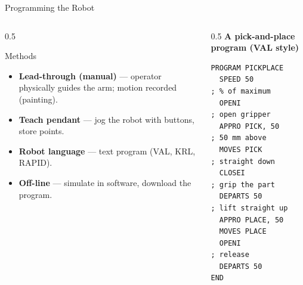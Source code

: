 \documentclass[aspectratio=169]{beamer}
\begin{document}
	\begin{frame}[fragile]{Programming the Robot}
		\begin{columns}[T]
			\begin{column}{0.5\textwidth}
				\begin{block}{Methods}
					\begin{itemize}\small
						\item \textbf{Lead-through (manual)} --- operator physically guides the arm; motion recorded (painting).
						\item \textbf{Teach pendant} --- jog the robot with buttons, store points.
						\item \textbf{Robot language} --- text program (VAL, KRL, RAPID).
						\item \textbf{Off-line} --- simulate in software, download the program.
					\end{itemize}
				\end{block}
			\end{column}
			\begin{column}{0.5\textwidth}
				\textbf{A pick-and-place program (VAL style)}
\begin{lstlisting}[style=valstyle]
PROGRAM PICKPLACE
  SPEED 50            ; % of maximum
  OPENI               ; open gripper
  APPRO PICK, 50      ; 50 mm above
  MOVES PICK          ; straight down
  CLOSEI              ; grip the part
  DEPARTS 50          ; lift straight up
  APPRO PLACE, 50
  MOVES PLACE
  OPENI               ; release
  DEPARTS 50
END
\end{lstlisting}
			\end{column}
		\end{columns}
	\end{frame}

\end{document}
